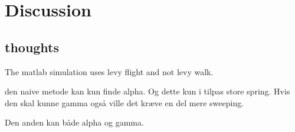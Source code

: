 \chapter{Discussion}

\section{thoughts}
The matlab simulation uses levy flight and not levy walk.

den naive metode kan kun finde alpha. Og dette kun i tilpas store spring. Hvis den skal kunne gamma også ville det kræve en del mere sweeping.


Den anden kan både alpha og gamma.